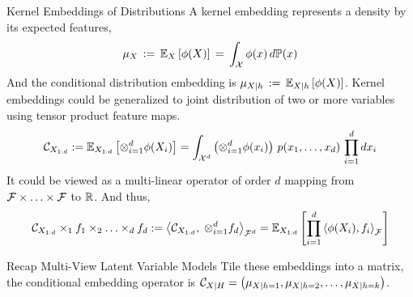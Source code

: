 \documentclass[final,t]{beamer}
\begin{document}
\begin{frame}{}
\begin{columns}[t]
\begin{column}{.3\linewidth}
\begin{block}{Kernel Embeddings of Distributions}
        A kernel embedding represents a density by its expected features,
        \begin{align*}
          \mu_{X} \, := \, \mathbb{E}_{X} \left[\phi(X)\right] \, = \, \int_{\mathcal{X}} \phi(x) \, d\mathbb{P}(x)
        \end{align*}
        And the conditional distribution embedding is 
        $
          \mu_{X|h} \, := \, \mathbb{E}_{X|h} \left[\phi(X)\right] 
        $.
        Kernel embeddings could be generalized to joint distribution of two or more variables using tensor product feature maps.
        \begin{eqnarray*}
            \mathcal{C}_{X_{1:d}}
            := \mathbb{E}_{X_{1:d}}\left[\otimes_{i=1}^d \phi(X_i)\right]
            = \int_{\mathcal{X}^d} \left(\otimes_{i=1}^d \phi(x_i)\right)
            \,p(x_1,\ldots,x_d)\, \prod_{i=1}^d dx_i
        \end{eqnarray*}
        It could be viewed as a \alert{multi-linear operator} of order $d$ mapping
        from $\mathcal{F}\times\ldots\times \mathcal{F}$ to $\mathbb{R}$. And thus,
        \begin{eqnarray*}
        \mathcal{C}_{X_{1:d}} \times_1 f_1 \times_2 \ldots \times_d f_d := \left\langle \mathcal{C}_{X_{1:d}},\;\otimes_{i=1}^d f_d \right\rangle_{\mathcal{F}^d}
        =\mathbb{E}_{X_{1:d}}\left[\prod_{i=1}^d \left\langle \phi(X_i),f_i \right\rangle_{\mathcal{F}}\right]
        \end{eqnarray*}
      \end{block}
      \vspace{-0.5in}
      \begin{block}{Recap Multi-View Latent Variable Models}
      Tile these embeddings into a matrix, the conditional embedding operator is
      $
        \mathcal{C}_{X|H} = \left(\mu_{X|h=1},\mu_{X|h=2},\ldots,\mu_{X|h=k}\right)
      $.


\end{block}
\end{column}
\end{columns}
\end{frame}
\end{document}
